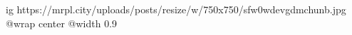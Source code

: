  
 
 
 
 

\ifcmt
  ig https://mrpl.city/uploads/posts/resize/w/750x750/sfw0wdevgdmchunb.jpg
  @wrap center
  @width 0.9
\fi
